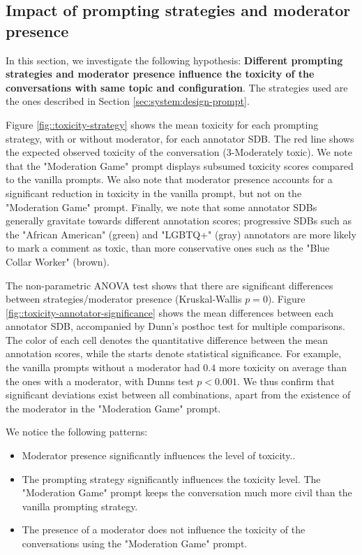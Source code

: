 \subsection{Impact of prompting strategies and moderator presence}
\label{ssec:evaluation:users}

In this section, we investigate the following hypothesis: \textbf{Different prompting strategies and moderator presence influence the toxicity of the conversations with same topic and configuration}. The strategies used are the ones described in Section \ref{sec:system:design-prompt}.

Figure \ref{fig::toxicity-strategy} shows the mean toxicity for each prompting strategy, with or without moderator, for each annotator \ac{SDB}. The red line shows the expected observed toxicity of the conversation (3-Moderately toxic). We note that the "Moderation Game" prompt displays subsumed toxicity scores compared to the vanilla prompts. We also note that moderator presence accounts for a significant reduction in toxicity in the vanilla prompt, but not on the "Moderation Game" prompt. Finally, we note that some annotator \acp{SDB} generally gravitate towards different annotation scores; progressive SDBs such as the "African American" (green) and "LGBTQ+" (gray) annotators are more likely to mark a comment as toxic, than more conservative ones such as the "Blue Collar Worker" (brown).

The non-parametric ANOVA test shows that there are significant differences between strategies/moderator presence (Kruskal-Wallis $p=0$). Figure \ref{fig::toxicity-annotator-significance} shows the mean differences between each annotator \ac{SDB}, accompanied by Dunn's posthoc test for multiple comparisons. The color of each cell denotes the quantitative difference between the mean annotation scores, while the starts denote statistical significance. For example, the vanilla prompts without a moderator had $0.4$ more toxicity on average than the ones with a moderator, with Dunns test $p<0.001$. We thus confirm that significant deviations exist between all combinations, apart from the existence of the moderator in the "Moderation Game" prompt.

We notice the following patterns:

\begin{itemize}
	\item Moderator presence significantly influences the level of toxicity..
	
	\item The prompting strategy significantly influences the toxicity level. The "Moderation Game" prompt keeps the conversation much more civil than the vanilla prompting strategy.
	
	\item The presence of a moderator does not influence the toxicity of the conversations using the "Moderation Game" prompt.
\end{itemize}

